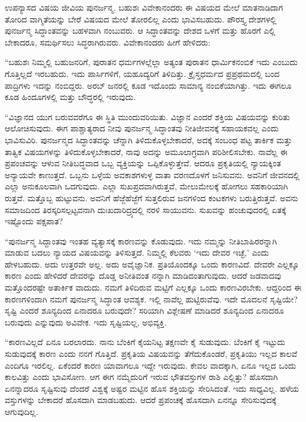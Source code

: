 ಉಪನ್ಯಾಸದ ವಿಷಯ ಜೀವಿಯ ಪುನರ್ಜನ್ಮ. ಬಹುಶಃ ವಿವೇಕಾನಂದರು ಈ ವಿಷಯದ ಮೇಲೆ ಮಾತನಾಡಿದಾಗ ತೋರಿದ ವಾಗ್ಮಿತೆಯನ್ನು ಬೇರೆ ವಿಷಯದ ಮೇಲೆ ತೋರಲಿಲ್ಲ ಎಂದು ಭಾವಿಸಬಹುದು. ಪೌರಸ್ತ್ಯ ದೇಶಗಳಲ್ಲಿ ಪುನರ್ಜನ್ಮ ಸಿದ್ಧಾಂತವನ್ನು ಬಹಳವಾಗಿ ನಂಬುವರು. ಆ ಸಿದ್ಧಾಂತವನ್ನು ದೇಶದ ಒಳಗೆ ಮತ್ತು ಹೊರಗೆ ಎಲ್ಲಿ ಬೇಕಾದರೂ, ಸಮರ್ಥಿಸಲು ಸಿದ್ಧರಾಗಿರುವರು. ವಿವೇಕಾನಂದರು ಹೀಗೆ ಹೇಳಿದರು:

“ಬಹುಶಃ ನಿಮ್ಮಲ್ಲಿ ಬಹುಜನರಿಗೆ, ಪುರಾತನ ಧರ್ಮಗಳಲ್ಲೆಲ್ಲಾ ಅತ್ಯಂತ ಪುರಾತನ ಧಾರ್ಮಿಕನಂಬಿಕೆ ಇದು ಎಂಬುದು ಗೊತ್ತಿಲ್ಲದೆ ಇರಬಹುದು. ಇದು ಪಾರ್ಸಿಗಳಿಗೆ, ಯಹೂದ್ಯರಿಗೆ ತಿಳಿದಿತ್ತು. ಕ್ರೈಸ್ತಧರ್ಮದ ಪ್ರಪ್ರಥಮದಲ್ಲಿ ಬಂದ ಪಾದ್ರಿಗಳು ಇದನ್ನು ನಂಬಿದ್ದರು. ಅರಬ್​ ಜನರಲ್ಲಿ ಕೂಡ ಇದೊಂದು ಸಾಮಾನ್ಯ ನಂಬಿಕೆಯಾಗಿತ್ತು. ಇದು ಈಗಲೂ ಕೂಡ ಹಿಂದೂಗಳಲ್ಲಿ ಮತ್ತು ಬೌದ್ಧರಲ್ಲಿ ಇರುವುದು.

“ವಿಜ್ಞಾನದ ಯುಗ ಬರುವವರೆಗೂ ಈ ಸ್ಥಿತಿ ಮುಂದುವರಿಯಿತು. ವಿಜ್ಞಾನ ಎಂದರೆ ಶಕ್ತಿಯ ವಿಷಯವನ್ನು ಕುರಿತು ಆಲೋಚಿಸುವುದು. ಈಗ ಪಾಶ್ಚಾತ್ಯರಾದ ನೀವು ಪುನರ್ಜನ್ಮ ಸಿದ್ಧಾಂತವು ನೀತಿಜೀವನಕ್ಕೆ ಸಹಾಯಕವಲ್ಲ ಎಂದು ಭಾವಿಸುವಿರಿ. ಪುನರ್ಜನ್ಮದ ಸಿದ್ಧಾಂತವನ್ನು ಚೆನ್ನಾಗಿ ತಿಳಿದುಕೊಳ್ಳಬೇಕಾದರೆ, ಅದಕ್ಕೆ ಸಂಬಂಧ ಪಟ್ಟ ತಾರ್ಕಿಕ ಮತ್ತು ತಾತ್ವಿಕ ವಿಷಯಗಳನ್ನು ತಿಳಿದುಕೊಳ್ಳಬೇಕಾದರೆ, ನಾವು ಅದನ್ನು ಅಮೂಲಾಗ್ರವಾಗಿ ಪರಿಶೀಲಿಸಬೇಕು. ನಾವೆಲ್ಲ ಈ ಪ್ರಪಂಚವನ್ನು ಆಳುವ ನೀತಿಬದ್ಧವಾದ ಒಬ್ಬ ವ್ಯಕ್ತಿಯನ್ನು ಒಪ್ಪಿಕೊಳ್ಳುತ್ತೇವೆ. ಆದರೂ ಪ್ರಕೃತಿಯಲ್ಲಿ ನ್ಯಾಯಕ್ಕಿಂತ ಅನ್ಯಾಯವೇ ಕಾಣುತ್ತದೆ. ಒಬ್ಬನು ಒಳ್ಳೆಯ ಅವಕಾಶಗಳುಳ್ಳ ವಾತಾ ವರಣದೊಳಗೆ ಜನಿಸುವನು. ಅವನಿಗೆ ಜೀವನದಲ್ಲಿ ಎಲ್ಲಾ ಅನುಕೂಲವಾಗಿ ಒದಗುವುದು. ಎಲ್ಲಾ ಸುಖಪ್ರದವಾಗಿರುತ್ತವೆ, ಮೇಲುಮೇಲಕ್ಕೆ ಹೋಗಲು ಸಹಕಾರಿಯಾಗಿ ರುತ್ತವೆ. ಮತ್ತೊಬ್ಬ ಹುಟ್ಟುವನು. ಅವನಿಗೆ ಹೆಜ್ಜೆಹೆಜ್ಜೆಗೆ ಸುತ್ತಲಿರುವ ಜನಗಳಿಂದ ಕಂಟಕಗಳು ಬರುತ್ತಿರುತ್ತವೆ. ಅವನು ಸಮಾಜದಿಂದ ತಿರಸ್ಕರಿಸಲ್ಪಟ್ಟವನಾಗಿ ದುಃಖದಾರಿದ್ರ್ಯದಲ್ಲಿ ನರಳಿ ಸಾಯುವನು. ಸುಖವನ್ನು ಹಂಚುವುದರಲ್ಲಿ ಏತಕ್ಕೆ ಇಷ್ಟೊಂದು ಪಕ್ಷಪಾತ?

“ಪುನರ್ಜನ್ಮ ಸಿದ್ದಾಂತವು ಇಂತಹ ವ್ಯತ್ಯಾಸಕ್ಕೆ ಕಾರಣವನ್ನು ಕೊಡುವುದು. ಇದು ನಮ್ಮನ್ನು ನೀತಿಬಾಹಿರರನ್ನಾಗಿ ಮಾಡುವ ಬದಲು ನ್ಯಾಯದ ವಿಷಯವನ್ನು ತಿಳಿಸುತ್ತದೆ. ನಿಮ್ಮಲ್ಲಿ ಕೆಲವರು ‘ಇದು ದೇವರ ಇಚ್ಛೆ,’ ಎಂದು ಹೇಳಬಹುದು. ಅದು ಉತ್ತರವೇ ಅಲ್ಲ. ಅದು ಅವೈಜ್ಞಾನಿಕ. ಪ್ರತಿಯೊಂದಕ್ಕೂ ಒಂದು ಕಾರಣವಿದೆ. ದೇವರೇ ಎಲ್ಲಕ್ಕೂ ಕಾರಣ ಎಂದು ಹೇಳಿದರೆ ದೇವರನ್ನು ದೊಡ್ಡ ಅನೀತಿವಂತ ನನ್ನಾಗಿ ಮಾಡಿದಂತಾಗುವುದು. ಆದರೆ ಜಡವಾದವು ಮತ್ತೊಂದರಷ್ಟೇ ಅತಾರ್ಕಿಕ ವಾದುದು. ನಮಗೆ ತಿಳಿದಿರುವ ಮಟ್ಟಿಗೆ ಎಲ್ಲಕ್ಕೂ ಒಂದು ಕಾರಣವಿರಬೇಕು. ಆದ್ದರಿಂದ ಈ ಕಾರಣಗಳಿಂದಾಗಿ ನಮಗೆ ಪುನರ್ಜನ್ಮ ಸಿದ್ಧಾಂತ ಆವಶ್ಯಕ. ಇಲ್ಲಿ ನಾವೆಲ್ಲ ಹುಟ್ಟಿರುವೆವು. ಇದೇ ಮೊದಲನೆ ಸೃಷ್ಟಿಯೇ? ಸೃಷ್ಟಿ ಎಂದರೆ ಶೂನ್ಯದಿಂದ ಏನಾದರೂ ಬರುವುದೇ? ಸರಿಯಾಗಿ ವಿಶ್ಲೇಷಣೆ ಮಾಡಿದರೆ ಶೂನ್ಯದಿಂದ ಏನಾದರೂ ಬರುವುದು ಎನ್ನುವುದು ಅವಿವೇಕ. ಇದು ಸೃಷ್ಟಿಯಲ್ಲ, ಅಭಿವ್ಯಕ್ತಿ.

“ಕಾರಣವಿಲ್ಲದೆ ಏನೂ ಬರಲಾರದು. ನಾನು ಬೆಂಕಿಗೆ ಕೈಯನಿಟ್ಟ ತಕ್ಷಣವೇ ಕೈ ಸುಡುವುದು. ಬೆಂಕಿಗೆ ಕೈ ಇಟ್ಟುದು ಸುಡುವುದಕ್ಕೆ ಕಾರಣ ಎಂದು ನನಗೆ ಗೊತ್ತಿದೆ. ಪ್ರಕೃತಿಯ ವಿಷಯವನ್ನು ತೆಗೆದುಕೊಂಡರೆ, ಪ್ರಕೃತಿಯು ಇಲ್ಲದ ಕಾಲವೆ ಎಂದಿಗೂ ಇರಲಿಲ್ಲ. ಏಕೆಂದರೆ ಕಾರಣ ಯಾವಾಗಲೂ ಇದ್ದೇ ಇರುವುದು. ಕೇವಲ ವಾದಕ್ಕಾಗಿ, ಏನೂ ಇಲ್ಲದ ಒಂದು ಕಾಲವಿತ್ತು ಎಂದು ಭಾವಿಸೋಣ. ಆಗ ಈಗ ನಮ್ಮೆದುರಿಗೆ ಇರುವ ಭೌತವಸ್ತುಗಳ ರಾಶಿ ಎಲ್ಲಿತ್ತು? ಹೊಸದಾಗಿ ಏನನ್ನಾದರೂ ಸೃಷ್ಟಿಸುವು ದೆಂದರೆ ವಿಶ್ವಕ್ಕೆ ಅಷ್ಟರ ಮಟ್ಟಿನ ಹೊಸ ಶಕ್ತಿಯನ್ನು ಸೇರಿಸಿದಂತೆ. ಇದು ಸಾಧ್ಯವಿಲ್ಲ. ಹಳೆಯ ವಸ್ತುಗಳನ್ನು ಬೇಕಾದರೆ ಹೊಸದಾಗಿ ಮಾಡಬಹುದು. ಆದರೆ ಪ್ರಪಂಚಕ್ಕೆ ಹೊಸದಾಗಿ ಏನನ್ನೂ ಸೇರಿಸುವುದಕ್ಕೆ ಆಗುವುದಿಲ್ಲ.

